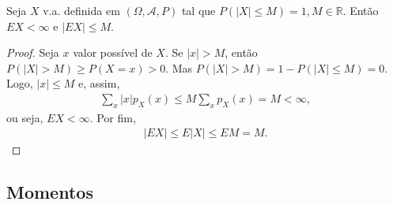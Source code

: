 \documentclass[../Notas.tex]{subfiles}
\begin{document}
\begin{theorem}
Seja $X$ v.a. definida em $(\Omega, \mathcal{A}, P)$ tal que $P(|X|\leq M) = 1, M\in\mathbb{R}$. Então $EX < \infty$ e $|EX|\leq M$.
\end{theorem}

\begin{proof}
Seja $x$ valor possível de $X$. Se $|x|>M$, então $P(|X|>M)\geq P(X=x)>0$. Mas $P(|X|>M) = 1 - P(|X|\leq M) = 0$. Logo, $|x|\leq M$ e, assim,
\begin{align*}
    \sum_x |x|p_X(x) \leq M\sum_x p_X(x) = M < \infty,
\end{align*}
ou seja, $EX < \infty$. Por fim,
\begin{align*}
    |EX| \leq E|X| \leq EM = M.
\end{align*}
\end{proof}



\subsection{Momentos}
\end{document}
